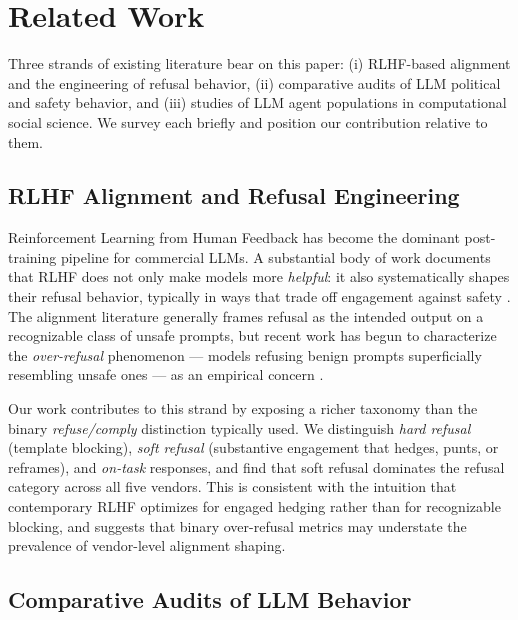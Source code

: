 \section{Related Work}\label{sec:related}

Three strands of existing literature bear on this paper: (i) RLHF-based
alignment and the engineering of refusal behavior, (ii) comparative
audits of LLM political and safety behavior, and (iii) studies of
LLM agent populations in computational social science. We survey each
briefly and position our contribution relative to them.

\subsection{RLHF Alignment and Refusal Engineering}\label{sec:related-rlhf}

Reinforcement Learning from Human Feedback \citep{christiano2017deep,
ouyang2022training,bai2022training} has become the dominant
post-training pipeline for commercial LLMs. A substantial body of work
documents that RLHF does not only make models more \emph{helpful}: it
also systematically shapes their refusal behavior, typically in ways
that trade off engagement against safety \citep{bai2022constitutional,
ganguli2022red,perez2022discovering}. The alignment literature
generally frames refusal as the intended output on a recognizable class
of unsafe prompts, but recent work has begun to characterize the
\emph{over-refusal} phenomenon --- models refusing benign prompts
superficially resembling unsafe ones --- as an empirical concern
\citep{rottger2024xstest,cui2024orbench}.

Our work contributes to this strand by exposing a richer taxonomy than
the binary \emph{refuse/comply} distinction typically used. We
distinguish \emph{hard refusal} (template blocking), \emph{soft refusal}
(substantive engagement that hedges, punts, or reframes), and \emph{on-task}
responses, and find that soft refusal dominates the refusal category
across all five vendors. This is consistent with the intuition that
contemporary RLHF optimizes for engaged hedging rather than for
recognizable blocking, and suggests that binary over-refusal metrics
may understate the prevalence of vendor-level alignment shaping.

\subsection{Comparative Audits of LLM Behavior}\label{sec:related-audits}

